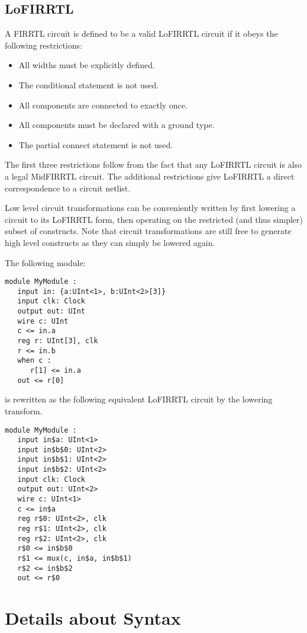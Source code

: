 \documentclass[12pt]{article}
\begin{document}
\subsection{LoFIRRTL}

A FIRRTL circuit is defined to be a valid LoFIRRTL circuit if it obeys the following restrictions:
\begin{itemize}
\item All widths must be explicitly defined.
\item The conditional statement is not used.
\item All components are connected to exactly once.
\item All components must be declared with a ground type.
\item The partial connect statement is not used.
\end{itemize}

The first three restrictions follow from the fact that any LoFIRRTL circuit is also a legal MidFIRRTL circuit. The additional restrictions give LoFIRRTL a direct correspondence to a circuit netlist.

Low level circuit transformations can be conveniently written by first lowering a circuit to its LoFIRRTL form, then operating on the restricted (and thus simpler) subset of constructs. Note that circuit transformations are still free to generate high level constructs as they can simply be lowered again.

The following module:
\begin{lstlisting}
module MyModule :
   input in: {a:UInt<1>, b:UInt<2>[3]}
   input clk: Clock
   output out: UInt
   wire c: UInt
   c <= in.a
   reg r: UInt[3], clk
   r <= in.b
   when c :
      r[1] <= in.a
   out <= r[0]   
\end{lstlisting}
is rewritten as the following equivalent LoFIRRTL circuit by the lowering transform.
\begin{lstlisting}
module MyModule :
   input in$a: UInt<1>
   input in$b$0: UInt<2>
   input in$b$1: UInt<2>
   input in$b$2: UInt<2>
   input clk: Clock
   output out: UInt<2>
   wire c: UInt<1>
   c <= in$a
   reg r$0: UInt<2>, clk
   reg r$1: UInt<2>, clk
   reg r$2: UInt<2>, clk 
   r$0 <= in$b$0
   r$1 <= mux(c, in$a, in$b$1)
   r$2 <= in$b$2
   out <= r$0
\end{lstlisting}

\section{Details about Syntax}
\end{document}

